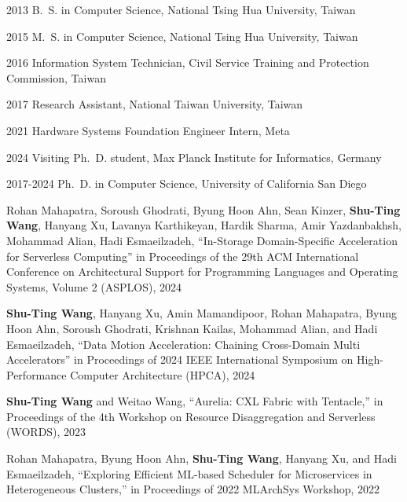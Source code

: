 \begin{frontmatter}
%
%
\begin{vitapage}
\begin{vita}
  \item[2013] B.~S. in Computer Science, National Tsing Hua University, Taiwan
  \item[2015] M.~S. in Computer Science, National Tsing Hua University, Taiwan
  \item[2016] Information System Technician, Civil Service Training and Protection Commission, Taiwan 
  \item[2017] Research Assistant, National Taiwan University, Taiwan
  \item[2021] Hardware Systems Foundation Engineer Intern, Meta
  \item[2024] Visiting Ph.~D. student, Max Planck Institute for Informatics, Germany
  \item[2017-2024] Ph.~D. in Computer Science, University of California San Diego
\end{vita}
\begin{publications}
  \item Rohan Mahapatra, Soroush Ghodrati, Byung Hoon Ahn, Sean Kinzer, \textbf{Shu-Ting Wang}, Hanyang Xu,  Lavanya Karthikeyan, Hardik Sharma,  Amir Yazdanbakhsh,  Mohammad Alian, Hadi Esmaeilzadeh, “In-Storage Domain-Specific Acceleration for Serverless Computing” in Proceedings of the 29th ACM International Conference on Architectural Support for Programming Languages and Operating Systems, Volume 2 (ASPLOS), 2024
  \item \textbf{Shu-Ting Wang}, Hanyang Xu, Amin Mamandipoor, Rohan Mahapatra, Byung Hoon Ahn, Soroush Ghodrati, Krishnan Kailas, Mohammad Alian, and Hadi Esmaeilzadeh, “Data Motion Acceleration: Chaining Cross-Domain Multi Accelerators” in Proceedings of 2024 IEEE International Symposium on High-Performance Computer Architecture (HPCA), 2024
  \item \textbf{Shu-Ting Wang} and Weitao Wang, “Aurelia: CXL Fabric with Tentacle,” in Proceedings of the 4th Workshop on Resource Disaggregation and Serverless (WORDS), 2023
  \item Rohan Mahapatra, Byung Hoon Ahn, \textbf{Shu-Ting Wang}, Hanyang Xu, and Hadi Esmaeilzadeh, “Exploring Eﬀicient ML-based Scheduler for Microservices in Heterogeneous Clusters,” in Proceedings of 2022 MLArchSys Workshop, 2022
\end{publications}
\end{vitapage}



\end{frontmatter}
